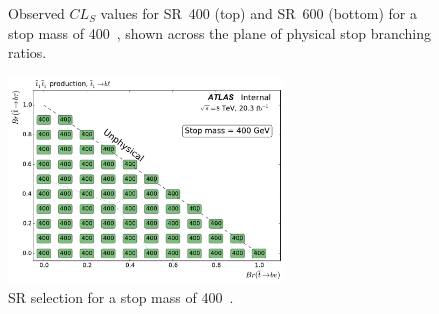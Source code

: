 \begin{figure}[ht]
  \centering
  \caption{
    Observed
    $CL_S$ values for SR~400 (top) and SR~600 (bottom) for a stop mass of
    400~\GeV,
    shown across the plane of physical stop branching ratios.
  }
\end{figure}

\begin{figure}[ht]
  \centering
  \includegraphics[width=0.65\textwidth]
    {figs/blstop/region_selection/region_choice_vs_br_m_400.pdf}
  \caption{
    SR selection for a stop mass of 400~\GeV.
  }
\end{figure}

